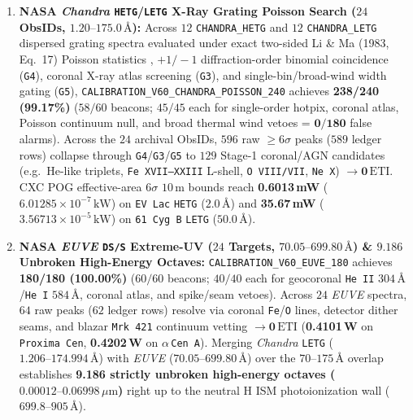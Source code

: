 \documentclass[twocolumn,10pt]{article}
\begin{document}
\begin{enumerate}
  \item \textbf{NASA \textit{Chandra} \texttt{HETG}/\texttt{LETG} X-Ray Grating Poisson Search ($24$ ObsIDs, $1.20\text{--}175.0\,\text{\AA}$):} Across $12$ \texttt{CHANDRA\_HETG} and $12$ \texttt{CHANDRA\_LETG} dispersed grating spectra evaluated under exact two-sided Li \& Ma (1983, Eq.~17) Poisson statistics \cite{LiMa1983}, $+1/-1$ diffraction-order binomial coincidence (\texttt{G4}), coronal X-ray atlas screening (\texttt{G3}), and single-bin/broad-wind width gating (\texttt{G5}), \texttt{CALIBRATION\_V60\_CHANDRA\_POISSON\_240} achieves \textbf{238/240 (99.17\%)} ($58/60$ beacons; $45/45$ each for single-order hotpix, coronal atlas, Poisson continuum null, and broad thermal wind vetoes = $\mathbf{0/180}$ false alarms). Across the $24$ archival ObsIDs, $596$ raw $\ge 6\sigma$ peaks ($589$ ledger rows) collapse through \texttt{G4}/\texttt{G3}/\texttt{G5} to $129$ Stage-1 coronal/AGN candidates (e.g.\ He-like triplets, \texttt{Fe XVII--XXIII} L-shell, \texttt{O VIII/VII}, \texttt{Ne X}) $\rightarrow \mathbf{0\,\mathrm{ETI}}$. CXC POG effective-area $6\sigma$ $10\,\text{m}$ bounds reach \textbf{0.6013\,mW} ($6.01285\times 10^{-7}\,\text{kW}$) on \texttt{EV\,Lac} \texttt{HETG} ($2.0\,\text{\AA}$) and \textbf{35.67\,mW} ($3.56713\times 10^{-5}\,\text{kW}$) on \texttt{61\,Cyg\,B} \texttt{LETG} ($50.0\,\text{\AA}$).
  \item \textbf{NASA \textit{EUVE} \texttt{DS/S} Extreme-UV ($24$ Targets, $70.05\text{--}699.80\,\text{\AA}$) \& $9.186$ Unbroken High-Energy Octaves:} \texttt{CALIBRATION\_V60\_EUVE\_180} achieves \textbf{180/180 (100.00\%)} ($60/60$ beacons; $40/40$ each for geocoronal \texttt{He\,II} $304\,\text{\AA}$/\texttt{He\,I} $584\,\text{\AA}$, coronal atlas, and spike/seam vetoes). Across $24$ \textit{EUVE} spectra, $64$ raw peaks ($62$ ledger rows) resolve via coronal \texttt{Fe}/\texttt{O} lines, detector dither seams, and blazar \texttt{Mrk\,421} continuum vetting $\rightarrow \mathbf{0\,\mathrm{ETI}}$ (\textbf{0.4101\,W} on \texttt{Proxima Cen}, \textbf{0.4202\,W} on $\alpha$\,\texttt{Cen\,A}). Merging \textit{Chandra} \texttt{LETG} ($1.206\text{--}174.994\,\text{\AA}$) with \textit{EUVE} ($70.05\text{--}699.80\,\text{\AA}$) over the $70\text{--}175\,\text{\AA}$ overlap establishes \textbf{9.186 strictly unbroken high-energy octaves ($0.00012\text{--}0.06998\,\mu\text{m}$)} right up to the neutral H ISM photoionization wall ($699.8\text{--}905\,\text{\AA}$).

\end{enumerate}
\end{document}
